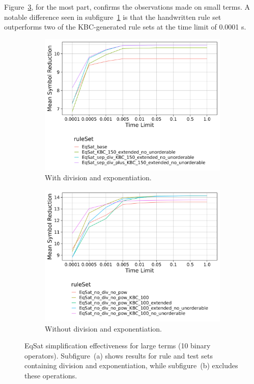 Figure~\ref{fig:eqsat_large_comparison}, for the most part, confirms the observations made on small terms. A notable difference seen in subfigure~\ref{fig:eqsat_large_with_div} is that the handwritten rule set outperforms two of the KBC-generated rule sets at the time limit of 0.0001 s.

\begin{figure}[h]
	\centering
	\begin{subfigure}[t]{0.48\textwidth}
		\includegraphics[width=\linewidth]{img/by_rule_set_random_terms_large.png}
		\caption{With division and exponentiation.}
		\label{fig:eqsat_large_with_div}
	\end{subfigure}\hfill
	\begin{subfigure}[t]{0.48\textwidth}
		\includegraphics[width=\linewidth]{img/by_rule_set_no_div_no_pow_random_terms_large.png}
		\caption{Without division and exponentiation.}
		\label{fig:eqsat_large_no_div}
	\end{subfigure}
	\caption{
		EqSat simplification effectiveness for large terms (10 binary operators).
		Subfigure~(a) shows results for rule and test sets containing division and exponentiation, 
		while subfigure~(b) excludes these operations.
	}
	\label{fig:eqsat_large_comparison}
\end{figure}

